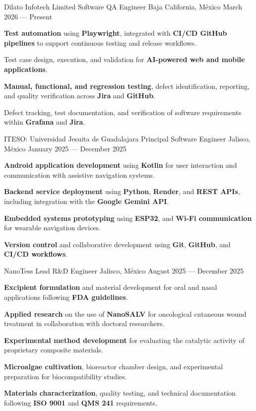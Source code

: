 \begin{cventries}
  \cventry
  {Dilato Infotech Limited}
  {Software QA Engineer}
  {Baja California, México}
  {March 2026 --- Present}
  {
    \begin{cvitems}
      \item {\textbf{Test automation} using \textbf{Playwright}, integrated with \textbf{CI/CD GitHub pipelines} to support continuous testing and release workflows.}
      \item {Test case design, execution, and validation for \textbf{AI-powered web and mobile applications}.}
      \item {\textbf{Manual, functional, and regression testing}, defect identification, reporting, and quality verification across \textbf{Jira} and \textbf{GitHub}.}
      \item {Defect tracking, test documentation, and verification of software requirements within \textbf{Grafana} and \textbf{Jira}.}
    \end{cvitems}
  }

  \cventry
  {ITESO\@: Universidad Jesuita de Guadalajara}
  {Principal Software Engineer}
  {Jalisco, México}
  {January 2025 --- December 2025}
  {
    \begin{cvitems}
      \item {\textbf{Android application development} using \textbf{Kotlin} for user interaction and communication with assistive navigation systems.}
      \item {\textbf{Backend service deployment} using \textbf{Python}, \textbf{Render}, and \textbf{REST APIs}, including integration with the \textbf{Google Gemini API}.}
      \item {\textbf{Embedded systems prototyping} using \textbf{ESP32}, and \textbf{Wi-Fi communication} for wearable navigation devices.}
      \item {\textbf{Version control} and collaborative development using \textbf{Git}, \textbf{GitHub}, and \textbf{CI/CD workflows}.}
    \end{cvitems}
  }

  \cventry
  {NanoTess}
  {Lead R\&D Engineer}
  {Jalisco, México}
  {August 2025 --- December 2025}
  {
    \begin{cvitems}
      \item {\textbf{Excipient formulation} and material development for oral and nasal applications following \textbf{FDA guidelines}.}
      \item {\textbf{Applied research} on the use of \textbf{NanoSALV} for oncological cutaneous wound treatment in collaboration with doctoral researchers.}
      \item {\textbf{Experimental method development} for evaluating the catalytic activity of proprietary composite materials.}
      \item {\textbf{Microalgae cultivation}, bioreactor chamber design, and experimental preparation for biocompatibility studies.}
      \item {\textbf{Materials characterization}, quality testing, and technical documentation following \textbf{ISO 9001} and \textbf{QMS 241} requirements.}
    \end{cvitems}
  }


\end{cventries}
